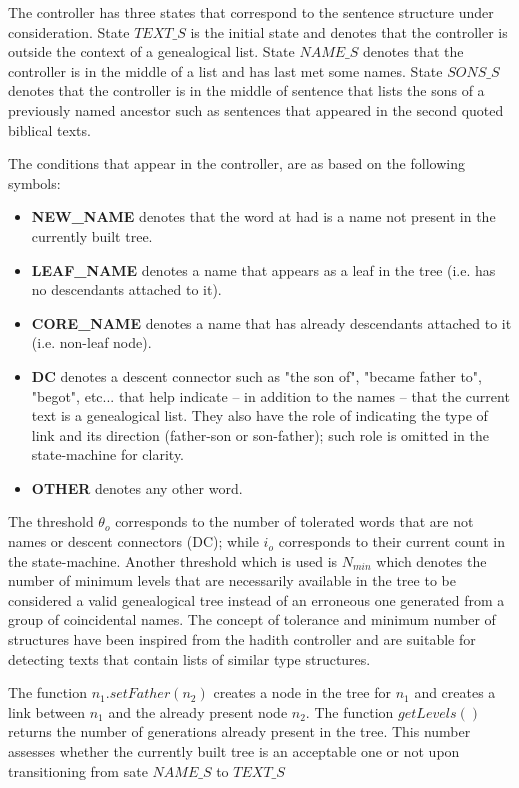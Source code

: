 \documentclass{llncs}
\begin{document}
The controller has three states that correspond to 
the sentence structure under consideration. 
State $\mathit{TEXT\_S}$ is the initial state and denotes 
that the controller is outside the context of a genealogical list.
State $\mathit{NAME\_S}$ denotes that the controller is in
the middle of a list and has last met some names. 
State $\mathit{SONS\_S}$ denotes that the controller is in
the middle of sentence that lists the sons of a previously named ancestor such as sentences that appeared in the second quoted biblical texts. 


The conditions that appear in the controller, are as based on the following symbols:
\begin{itemize}
\item {\bf NEW\_NAME} denotes that the word at had is a name not present in the
	currently built tree.
\item {\bf LEAF\_NAME} denotes a name that appears as a leaf in the tree (i.e. has no
	descendants attached to it).
\item {\bf CORE\_NAME} denotes a name that has already descendants attached to it (i.e. 
	non-leaf node).
\item {\bf DC} denotes a descent connector such as "the son of", "became father to",
	"begot", etc... that help indicate -- in addition to the names -- that the current text
	is a genealogical list. They also have the role of indicating the type of link and its 
	direction (father-son or son-father); such role is omitted in the state-machine for clarity.
\item {\bf OTHER} denotes any other word.
\end{itemize}
The threshold $\theta_{\mathit{o}}$ 
corresponds to the number of tolerated words that are not names 
or descent connectors (DC); while 
$i_{\mathit{o}}$ corresponds to their current count in the state-machine. 
Another threshold which is used is $\mathit{N_{min}}$ which denotes the number of minimum
levels that are necessarily available in the tree to be considered a valid genealogical
tree instead of an erroneous one generated from a group of coincidental names. The
concept of tolerance and minimum number of structures have been inspired from the
hadith controller and are suitable for detecting texts that contain lists of similar
type structures.

The function $\mathit{n_1.setFather(n_2)}$ creates a node in the tree 
for $\mathit{n_1}$ and creates
a link between $\mathit{n_1}$ and the already present node $\mathit{n_2}$. 
The function $\mathit{getLevels()}$ 
returns the number of generations already present in the tree. This number
assesses whether the currently built tree is an acceptable one or not upon
transitioning from sate $\mathit{NAME\_S}$ to $\mathit{TEXT\_S}$
\end{document}
